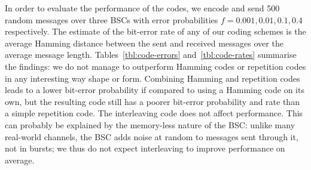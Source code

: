 \documentclass[10pt,a4paper,oneside,onecolumn]{article}
\begin{document}
In order to evaluate the performance of the codes, we encode and send 500 random
messages over three BSCs with error probabilities $f = 0.001, 0.01, 0.1, 0.4$
respectively. The estimate of the bit-error rate of any of our coding schemes is
the average Hamming distance between the sent and received messages over the
average message length. Tables~\ref{tbl:code-errors} and~\ref{tbl:code-rates}
summarise the findings: we do not manage to outperform Hamming codes or
repetition codes in any interesting way shape or form. Combining Hamming and
repetition codes leads to a lower bit-error probability if compared to using a
Hamming code on its own, but the resulting code still has a poorer bit-error
probability and rate than a simple repetition code. The interleaving code does
not affect performance. This can probably be explained by the memory-less nature
of the BSC: unlike many real-world channels, the BSC adds noise at random to
messages sent through it, not in bursts; we thus do not expect interleaving to
improve performance on average.
\end{document}
